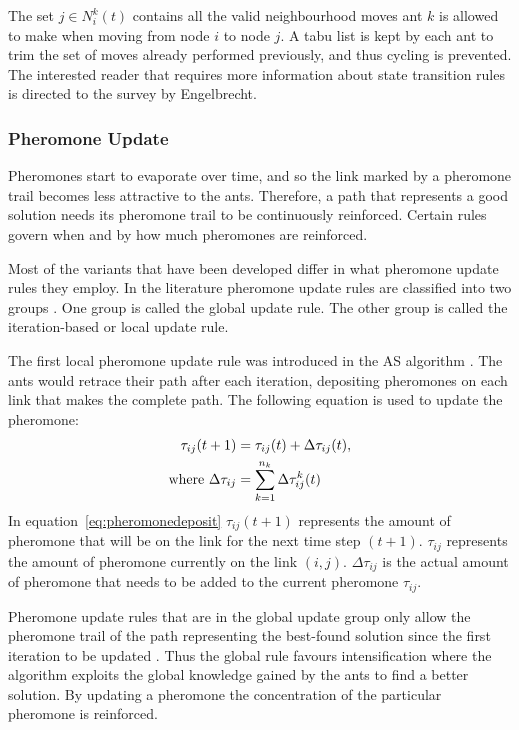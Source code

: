 The set $j \in N^k_i(t)$ contains all the valid neighbourhood moves ant $k$ is allowed to make when moving from node $i$ to node $j$. A tabu list is kept by each ant to trim the set of moves already performed previously, and thus cycling is prevented. The interested reader that requires more information about state transition rules is directed to the survey by Engelbrecht\cite{FundamentalSwarm}.
\subsubsection{Pheromone Update}
Pheromones start to evaporate over time, and so the link marked by a pheromone trail becomes less attractive to the ants. Therefore, a path that represents a good solution needs its pheromone trail to be continuously reinforced. Certain rules govern when and by how much pheromones are reinforced.

 Most of the variants that have been developed differ in what pheromone update rules they employ. In the literature pheromone update rules are classified into two groups \cite{CompuIntelligenceIntro}. One group is called the global update rule. The other group is called the iteration-based or local update rule\cite{CompuIntelligenceIntro}. 

The first local pheromone update rule was introduced in the \gls{AS} algorithm \cite{CompuIntelligenceIntro,AntSurvey,AntsAndStigmergy}. The ants would retrace their path after each iteration, depositing pheromones on each link that makes the complete path. The following equation is used to update the pheromone:
\begin{align}
\label{eq:pheromonedeposit}
 \tau_{ij}(t+1) &= \tau_{ij}(t) + \Delta\tau_{ij}(t),\\ 
 \text{where }\Delta\tau_{ij} &= \sum^{n_k}_{k=1}\Delta\tau^k_{ij}(t) \notag
\end{align}
In equation~\ref{eq:pheromonedeposit} $\tau_{ij}(t+1)$ represents the amount of pheromone that will be on the link for the next time step $(t+1)$. $\tau_{ij}$ represents the amount of pheromone currently on the link $(i,j)$. $\Delta\tau_{ij}$ is the actual amount of pheromone that needs to be added to the current pheromone $\tau_{ij}$.

Pheromone update rules that are in the global update group only allow the pheromone trail of the path representing the best-found solution since the first iteration to be updated \cite{CompuIntelligenceIntro}. Thus the global rule favours intensification where the algorithm exploits the global knowledge gained by the ants to find a better solution. By updating a pheromone the concentration of the particular pheromone is reinforced.

